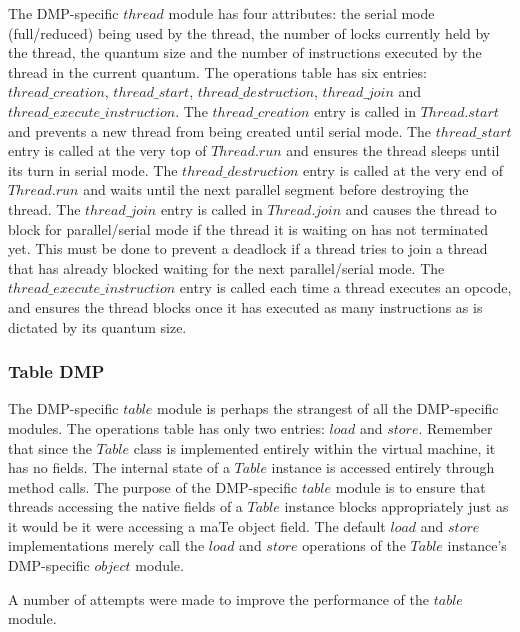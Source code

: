 The DMP-specific $thread$ module has four attributes: the serial mode
(full/reduced) being used by the thread, the number of locks currently
held by the thread, the quantum size and the number of instructions
executed by the thread in the current quantum.  The operations table
has six entries: $thread\_creation$, $thread\_start$,
$thread\_destruction$, $thread\_join$ and
$thread\_execute\_instruction$.  The $thread\_creation$ entry is
called in $Thread.start$ and prevents a new thread from being created
until serial mode.  The $thread\_start$ entry is called at the very
top of $Thread.run$ and ensures the thread sleeps until its turn in
serial mode.  The $thread\_destruction$ entry is called at the very
end of $Thread.run$ and waits until the next parallel segment before
destroying the thread.  The $thread\_join$ entry is called in
$Thread.join$ and causes the thread to block for parallel/serial mode
if the thread it is waiting on has not terminated yet.  This must be
done to prevent a deadlock if a thread tries to join a thread that has
already blocked waiting for the next parallel/serial mode.  The
$thread\_execute\_instruction$ entry is called each time a thread
executes an opcode, and ensures the thread blocks once it has executed
as many instructions as is dictated by its quantum size.

\subsubsection{Table DMP}

The DMP-specific $table$ module is perhaps the strangest of all the
DMP-specific modules.  The operations table has only two entries:
$load$ and $store$.  Remember that since the $Table$ class is
implemented entirely within the virtual machine, it has no fields.
The internal state of a $Table$ instance is accessed entirely through
method calls.  The purpose of the DMP-specific $table$ module is to
ensure that threads accessing the native fields of a $Table$ instance
blocks appropriately just as it would be it were accessing a maTe
object field.  The default $load$ and $store$ implementations merely
call the $load$ and $store$ operations of the $Table$ instance's
DMP-specific $object$ module.

A number of attempts were made to improve the performance of the
$table$ module.

